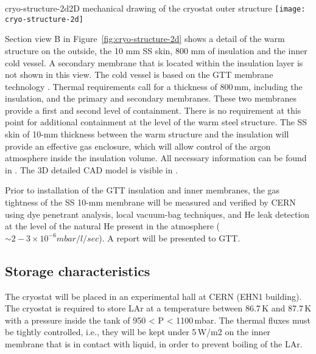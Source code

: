 \begin{cdrfigure}{cryo-structure-2d}{2D mechanical drawing of the cryostat outer structure}
  \texttt{[image: cryo-structure-2d]}
\end{cdrfigure}

Section view B in Figure~\ref{fig:cryo-structure-2d} shows a detail of the warm structure on the outside, the 10 mm SS skin, 800 mm of insulation and the inner cold vessel. 
A secondary membrane that is located within the insulation layer is not shown in this view.  The cold vessel is based on the GTT membrane technology \cite{gtt}.   Thermal requirements 
call for %
a thickness of 800\,mm, including the insulation, and the primary and secondary membranes. These two membranes provide a first and second level of containment. There is no requirement at this point for additional containment at the level of the warm steel structure. The SS skin of 10-mm thickness between the warm structure and the insulation will provide an effective gas enclosure, which will allow control of the argon atmosphere inside the insulation volume.
All necessary information can be found in \cite{edms1}. 
The 3D detailed CAD model is visible in \cite{edms2}. 

Prior to installation of the GTT insulation and %
inner membranes, the gas tightness of the SS 10-mm membrane will be measured and verified by CERN using dye penetrant analysis, local vacuum-bag techniques, and He leak %
detection at the level of the natural He present in the atmosphere ($\sim2-3 \times 10^{-6} mbar/l/sec$). A report will be presented to GTT.

\subsection{Storage characteristics}


The cryostat will be placed in an experimental hall at CERN (EHN1 building). The 
cryostat is required to store LAr at a temperature between 86.7\,K and 87.7\,K with a pressure inside the 
tank of 950 < P < 1100\,mbar. %
The thermal fluxes must be tightly controlled, i.e., %
they will be kept under 5\,W/m2 on %
the inner membrane that is in contact with liquid, in order to prevent boiling of the LAr.

